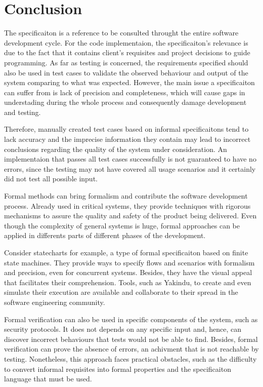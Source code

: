 \chapter{Conclusion}
\label{cap:conclusoes}

The specificaiton is a reference to be consulted throught the entire software development cycle. For the code implementaion, the specificaiton's relevance is due to the fact that it contains client's requisites and project decisions to guide programming. As far as testing is concerned, the requirements specified should also be used in test cases to validate the observed behaviour and output of the system comparing to what was expected. However, the main issue a specificaiton can suffer from is lack of precision and completeness, which will cause gaps in understading during the whole process and consequently damage development and testing.

Therefore, manually created test cases based on informal specificaitons tend to lack accuracy and the imprecise information they contain may lead to incorrect conclusions regarding the quality of the system under consideration. An implementaion that passes all test cases successfully is not guaranteed to have no errors, since the testing may not have covered all usage scenarios and it certainly did not test all possible input.

Formal methods can bring formalism and contribute the software development process. Already used in critical systems, they provide techniques with rigorous mechanisms to assure the quality and safety of the product being delivered. Even though the complexity of general systems is huge, formal approaches can be applied in differents parts of different phases of the development.

Consider statecharts for example, a type of formal specificaiton based on finite state machines. They provide ways to specify flows and scenarios with formalism and precision, even for concurrent systems. Besides, they have the visual appeal that facilitates their comprehension. Tools, such as Yakindu, to create and even simulate their execution are available and collaborate to their spread in the software engineering community.

Formal verification can also be used in specific components of the system, such as security protocols. It does not depends on any specific input and, hence, can discover incorrect behaviours that tests would not be able to find. Besides, formal verification can prove the absence of errors, an achivment that is not reachable by testing. Nonetheless, this approach faces practical obstacles, such as the difficulty to convert informal requisites into formal properties and the specificaiton language that must be used.

